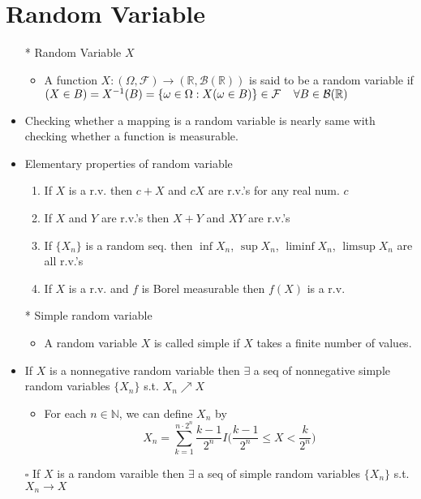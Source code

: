 \documentclass[12pt, A4]{article}
\begin{document}
\section{Random Variable}
\begin{itemize}
	\item[*] Random Variable $X$
	\begin{itemize}
		\item A function $X : (\Omega, \mathcal{F}) \rightarrow (\mathbb{R}, \mathcal{B}(\mathbb{R}))$ is said to be a random variable if \\$(X\in B)=X^{-1}(B)=\{\omega\in\Omega : X(\omega\in B)\}\in\mathcal{F} \hspace{0.4cm} \forall B\in\mathcal{B}(\mathbb{R}) $ 
	\end{itemize}
	\item Checking whether a mapping is a random variable is nearly same with checking whether a function is measurable.
	\item Elementary properties of random variable
	\begin{enumerate}
   	\item If $X$ is a r.v. then $c+X$ and $cX$ are r.v.'s for any real num. $c$
   	\item If $X$ and $Y$ are r.v.'s then $X+Y$ and $XY$ are r.v.'s
   	\item If $\{X_n\}$ is a random seq. then $\inf X_n$, $\sup X_n$, $\liminf X_n$, $\limsup X_n$ are all r.v.'s
   	\item If $X$ is a r.v. and $f$ is Borel measurable then $f(X)$ is a r.v.
	\end{enumerate}
    \item[*] Simple random variable
    \begin{itemize}
    	\item A random variable $X$ is called simple if $X$ takes a finite number of values.
    \end{itemize}
    \item If $X$ is a nonnegative random variable then $\exists$ a seq of nonnegative simple random variables $\{X_n\}$ s.t. $X_n\nearrow X$
    \begin{itemize}
		\item For each $n\in \mathbb{N}$, we can define $X_n$ by $$X_n=\sum_{k=1}^{n\cdot 2^n}\frac{k-1}{2^n}I\Big(\frac{k-1}{2^n}\leq X<\frac{k}{2^n}\Big) $$
	\end{itemize}
    \item[$\square$] If $X$ is a random varaible then $\exists$ a seq of simple random variables $\{X_n\}$ s.t. $X_n\rightarrow X$

\end{itemize}
\end{document}
